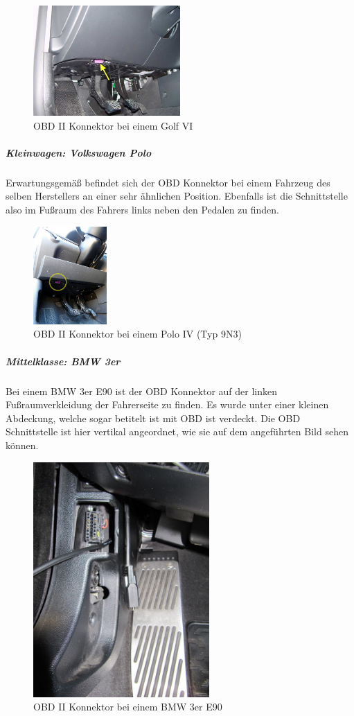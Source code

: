 \begin{figure}[!htb]\centering
	\includegraphics[width=0.5\textwidth]{images/golfobd}
	\caption{OBD II Konnektor bei einem Golf VI \cite{Golf.OBD}}\label{Fig:Data3}
\end{figure}

\subparagraph{Kleinwagen: Volkswagen Polo}
Erwartungsgemäß befindet sich der OBD Konnektor bei einem Fahrzeug des selben Herstellers an einer sehr ähnlichen Position. Ebenfalls ist die Schnittstelle also im Fußraum des Fahrers links neben den Pedalen zu finden.

\begin{figure}[!htb]\centering
	\includegraphics[width=0.25\textwidth]{images/poloobd}
	\caption{OBD II Konnektor bei einem Polo IV (Typ 9N3) \cite{Polo.OBD}}\label{Fig:Data3}
\end{figure}

\subparagraph{Mittelklasse: BMW 3er}
Bei einem BMW 3er E90 ist der OBD Konnektor auf der linken Fußraumverkleidung der Fahrerseite zu finden. Es wurde unter einer kleinen Abdeckung, welche sogar betitelt ist mit OBD ist verdeckt. Die OBD Schnittstelle ist hier vertikal angeordnet, wie sie auf dem angeführten Bild sehen können.

\begin{figure}[!htb]\centering
	\includegraphics[width=0.6\textwidth]{images/3erobd}
	\caption{OBD II Konnektor bei einem BMW 3er E90 \cite{3er.OBD}}\label{Fig:Data3}
\end{figure}

\newpage
